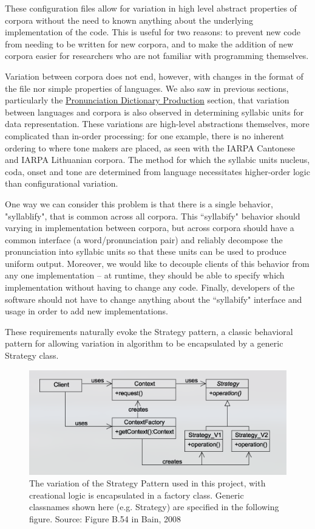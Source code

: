 \documentclass[11pt]{article}
\begin{document}
These configuration files allow for variation in high level abstract properties of corpora without the need to known anything about the underlying implementation of the code. This is useful for two reasons: to prevent new code from needing to be written for new corpora, and to make the addition of new corpora easier for researchers who are not familiar with programming themselves.

Variation between corpora does not end, however, with changes in the format of the file nor simple properties of languages. We also saw in previous sections, particularly the \hyperlink{section.24}{Pronunciation Dictionary Production} section, that variation between languages and corpora is also observed in determining syllabic units for data representation. These variations are high-level abstractions themselves, more complicated than in-order processing: for one example, there is no inherent ordering to where tone makers are placed, as seen with the IARPA Cantonese and IARPA Lithuanian corpora. The method for which the syllabic units nucleus, coda, onset and tone are determined from language necessitates higher-order logic than configurational variation.

One way we can consider this problem is that there is a single behavior, "syllablify", that is common across all corpora. This ``syllabify" behavior should varying in implementation between corpora, but across corpora should have a common interface (a word/pronunciation pair) and reliably decompose the pronunciation into syllabic units so that these units can be used to produce uniform output. Moreover, we would like to decouple clients of this behavior from any one implementation -- at runtime, they should be able to specify which implementation without having to change any code. Finally, developers of the software should not have to change anything about the ``syllabify" interface and usage in order to add new implementations. 

These requirements naturally evoke the Strategy pattern\cite{freeman_head_2004}, a classic behavioral pattern for allowing variation in algorithm to be encapsulated by a generic Strategy class.

\begin{figure}[h]
\centering
\includegraphics[scale=0.5]{strategy-pattern.png}
\caption{The variation of the Strategy Pattern used in this project, with creational logic is encapsulated in a factory class. Generic classnames shown here (e.g. Strategy) are specified in the following figure. Source: Figure B.54 in Bain, 2008\cite{bain_emergent_2008}}
\label{fig:strategy-pattern}
\end{figure}
\end{document}
